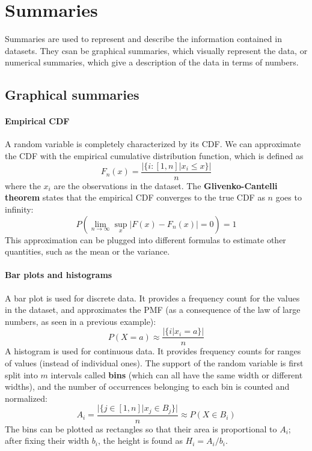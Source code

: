 \section{Summaries}

Summaries are used to represent and describe the information contained in datasets. They csan be graphical summaries, which visually represent the data, or numerical summaries, which give a description of the data in terms of numbers.

\subsection{Graphical summaries}
\paragraph{Empirical CDF} A random variable is completely characterized by its CDF. We can approximate the CDF with the empirical cumulative distribution function, which is defined as
\begin{equation*}
    F_n(x) = \frac{|\{ i : [1,n] | x_i \leq x \}|}{n}
\end{equation*}
where the $x_i$ are the observations in the dataset. The \textbf{Glivenko-Cantelli theorem} states that the empirical CDF converges to the true CDF as $n$ goes to infinity:
\begin{equation*}
    P(\lim_{n \to \infty} \sup_x |F(x) - F_n(x)| = 0) = 1
\end{equation*}
This approximation can be plugged into different formulas to estimate other quantities, such as the mean or the variance.

\paragraph{Bar plots and histograms}
A bar plot is used for discrete data. It provides a frequency count for the values in the dataset, and approximates the PMF (as a consequence of the law of large numbers, as seen in a previous example):
\begin{equation*}
    P(X = a) \approx \frac{|\{ i | x_i = a \}|}{n}
\end{equation*}
A histogram is used for continuous data. It provides frequency counts for ranges of values (instead of individual ones). The support of the random variable is first split into $m$ intervals called \textbf{bins} (which can all have the same width or different widths), and the number of occurrences belonging to each bin is counted and normalized:
\begin{equation*}
    A_i = \frac{|\{ j \in [1,n] |x_j \in B_j\}|}{n} \approx P(X \in B_i)
\end{equation*}
The bins can be plotted as rectangles so that their area is proportional to $A_i$; after fixing their width $b_i$, the height is found as $H_i = A_i / b_i$.

